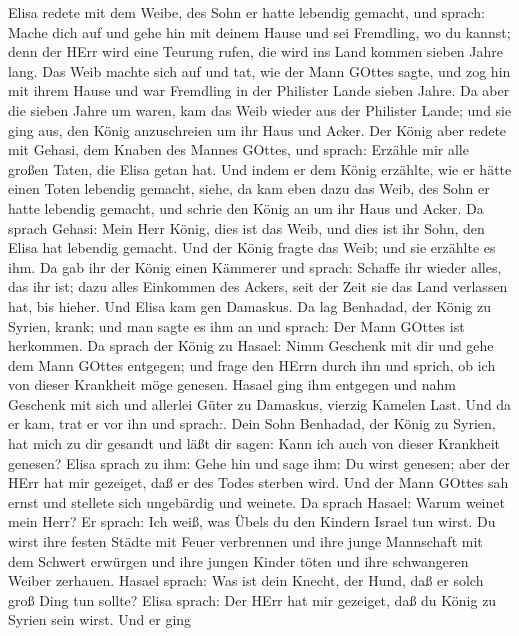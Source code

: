  Elisa redete mit dem Weibe, des Sohn er hatte lebendig
gemacht, und sprach: Mache dich auf und gehe hin mit deinem Hause und
sei Fremdling, wo du kannst; denn der HErr wird eine Teurung rufen, die
wird ins Land kommen sieben Jahre lang.  Das Weib machte
sich auf und tat, wie der Mann GOttes sagte, und zog hin mit ihrem Hause
und war Fremdling in der Philister Lande sieben Jahre.  Da
aber die sieben Jahre um waren, kam das Weib wieder aus der Philister
Lande; und sie ging aus, den König anzuschreien um ihr Haus und Acker.
 Der König aber redete mit Gehasi, dem Knaben des Mannes
GOttes, und sprach: Erzähle mir alle großen Taten, die Elisa getan hat.
 Und indem er dem König erzählte, wie er hätte einen Toten
lebendig gemacht, siehe, da kam eben dazu das Weib, des Sohn er hatte
lebendig gemacht, und schrie den König an um ihr Haus und Acker. Da
sprach Gehasi: Mein Herr König, dies ist das Weib, und dies ist ihr
Sohn, den Elisa hat lebendig gemacht.  Und der König fragte
das Weib; und sie erzählte es ihm. Da gab ihr der König einen Kämmerer
und sprach: Schaffe ihr wieder alles, das ihr ist; dazu alles Einkommen
des Ackers, seit der Zeit sie das Land verlassen hat, bis hieher.
 Und Elisa kam gen Damaskus. Da lag Benhadad, der König zu
Syrien, krank; und man sagte es ihm an und sprach: Der Mann GOttes ist
herkommen.  Da sprach der König zu Hasael: Nimm Geschenk mit
dir und gehe dem Mann GOttes entgegen; und frage den HErrn durch ihn und
sprich, ob ich von dieser Krankheit möge genesen.  Hasael
ging ihm entgegen und nahm Geschenk mit sich und allerlei Güter zu
Damaskus, vierzig Kamelen Last. Und da er kam, trat er vor ihn und
sprach:. Dein Sohn Benhadad, der König zu Syrien, hat mich zu dir
gesandt und läßt dir sagen: Kann ich auch von dieser Krankheit genesen?
 Elisa sprach zu ihm: Gehe hin und sage ihm: Du wirst
genesen; aber der HErr hat mir gezeiget, daß er des Todes sterben wird.
 Und der Mann GOttes sah ernst und stellete sich ungebärdig
und weinete.  Da sprach Hasael: Warum weinet mein Herr? Er
sprach: Ich weiß, was Übels du den Kindern Israel tun wirst. Du wirst
ihre festen Städte mit Feuer verbrennen und ihre junge Mannschaft mit
dem Schwert erwürgen und ihre jungen Kinder töten und ihre schwangeren
Weiber zerhauen.  Hasael sprach: Was ist dein Knecht, der
Hund, daß er solch groß Ding tun sollte? Elisa sprach: Der HErr hat mir
gezeiget, daß du König zu Syrien sein wirst.  Und er ging
